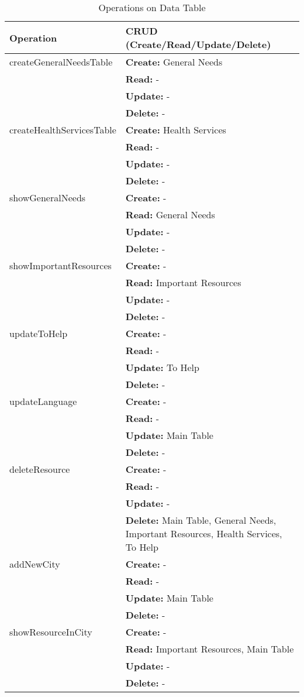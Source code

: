 \documentclass[12pt, letterpaper]{article}
\begin{document}
\begin{table}[H]
\centering
\begin{tabularx}{\textwidth}{|X|p{10cm}|}
\hline
\textbf{Operation} & \textbf{CRUD (Create/Read/Update/Delete)} \\
\hline
     createGeneralNeedsTable & \textbf{Create:} General Needs \\
     & \textbf{Read:} - \\
     & \textbf{Update:} - \\
     & \textbf{Delete:} - \\
\hline
     createHealthServicesTable & \textbf{Create:} Health Services \\
     & \textbf{Read:} - \\
     & \textbf{Update:} - \\
     & \textbf{Delete:} - \\
\hline
     showGeneralNeeds & \textbf{Create:} - \\
     & \textbf{Read:} General Needs \\
     & \textbf{Update:} - \\
     & \textbf{Delete:} - \\
\hline
     showImportantResources & \textbf{Create:} - \\
     & \textbf{Read:} Important Resources \\
     & \textbf{Update:} - \\
     & \textbf{Delete:} - \\
\hline
     updateToHelp & \textbf{Create:} - \\
     & \textbf{Read:} - \\
     & \textbf{Update:} To Help \\
     & \textbf{Delete:} - \\
\hline
     updateLanguage & \textbf{Create:} - \\
     & \textbf{Read:} - \\
     & \textbf{Update:} Main Table \\
     & \textbf{Delete:} - \\
\hline
     deleteResource & \textbf{Create:} - \\
     & \textbf{Read:} - \\
     & \textbf{Update:} - \\
     & \textbf{Delete:} Main Table, General Needs, Important Resources, Health Services, To Help \\
\hline
     addNewCity & \textbf{Create:} - \\
     & \textbf{Read:} - \\
     & \textbf{Update:} Main Table \\
     & \textbf{Delete:} - \\
\hline
     showResourceInCity & \textbf{Create:} - \\
     & \textbf{Read:} Important Resources, Main Table \\
     & \textbf{Update:} - \\
     & \textbf{Delete:} - \\
\hline

\end{tabularx}
\caption{Operations on Data Table}
\label{tab:opOnData}
\end{table}
\end{document}
